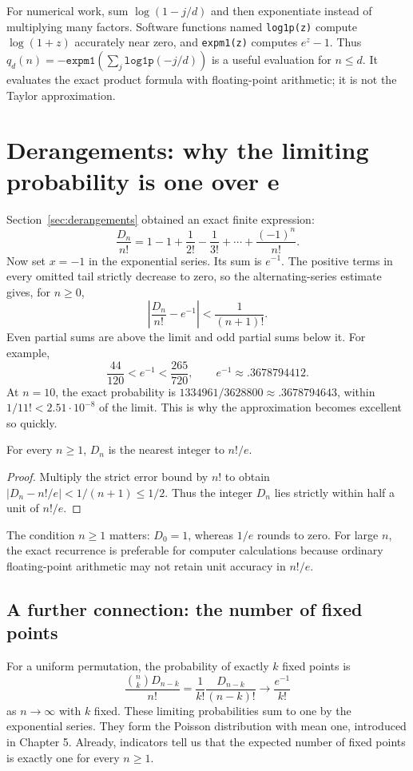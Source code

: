 \begin{labbox}[title={Calculate with small tails intact}]
For numerical work, sum $\log(1-j/d)$ and then exponentiate instead of
multiplying many factors. Software functions named \texttt{log1p(z)}
compute $\log(1+z)$ accurately near zero, and \texttt{expm1(z)} computes
$e^z-1$. Thus $q_d(n)=-\texttt{expm1}(\sum_j\texttt{log1p}(-j/d))$
is a useful evaluation for $n\le d$. It evaluates the exact product
formula with floating-point arithmetic; it is not the Taylor approximation.
\end{labbox}

\section{Derangements: why the limiting probability is one over e}
\label{sec:calc-derangements}

Section~\ref{sec:derangements} obtained an exact finite expression:
\[
 \frac{D_n}{n!}=1-1+\frac1{2!}-\frac1{3!}+\cdots+\frac{(-1)^n}{n!}.
\]
Now set $x=-1$ in the exponential series. Its sum is $e^{-1}$.
The positive terms in every omitted tail strictly decrease to zero, so
the alternating-series estimate gives, for $n\ge0$,
\[
 \left|\frac{D_n}{n!}-e^{-1}\right|<\frac1{(n+1)!}.
\]
Even partial sums are above the limit and odd partial sums below it.
For example,
\[
 \frac{44}{120}<e^{-1}<\frac{265}{720},
 \qquad e^{-1}\approx.3678794412.
\]
At $n=10$, the exact probability is
$1334961/3628800\approx.3678794643$, within $1/11!<2.51\cdot10^{-8}$
of the limit. This is why the approximation becomes excellent so quickly.

\begin{proposition}
For every $n\ge1$, $D_n$ is the nearest integer to $n!/e$.
\end{proposition}
\begin{proof}
Multiply the strict error bound by $n!$ to obtain
$|D_n-n!/e|<1/(n+1)\le1/2$. Thus the integer $D_n$ lies strictly
within half a unit of $n!/e$.
\end{proof}
The condition $n\ge1$ matters: $D_0=1$, whereas $1/e$ rounds to zero.
For large $n$, the exact recurrence is preferable for computer
calculations because ordinary floating-point arithmetic may not retain
unit accuracy in $n!/e$.

\subsection*{A further connection: the number of fixed points}
For a uniform permutation, the probability of exactly $k$ fixed points is
\[
 \frac{\binom nk D_{n-k}}{n!}
 =\frac1{k!}\frac{D_{n-k}}{(n-k)!}\longrightarrow\frac{e^{-1}}{k!}
\]
as $n\to\infty$ with $k$ fixed. These limiting probabilities sum to one
by the exponential series. They form the Poisson distribution with mean
one, introduced in Chapter 5. Already, indicators tell us that the
expected number of fixed points is exactly one for every $n\ge1$.

